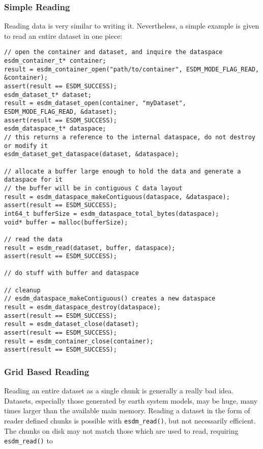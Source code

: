 \subsubsection{Simple Reading}

Reading data is very similar to writing it. 
Nevertheless, a simple example is given to read an entire dataset in one piece:

\begin{lstlisting}
// open the container and dataset, and inquire the dataspace
esdm_container_t* container;
result = esdm_container_open("path/to/container", ESDM_MODE_FLAG_READ, &container);
assert(result == ESDM_SUCCESS);
esdm_dataset_t* dataset;
result = esdm_dataset_open(container, "myDataset", ESDM_MODE_FLAG_READ, &dataset);
assert(result == ESDM_SUCCESS);
esdm_dataspace_t* dataspace;
// this returns a reference to the internal dataspace, do not destroy or modify it
esdm_dataset_get_dataspace(dataset, &dataspace);  

// allocate a buffer large enough to hold the data and generate a dataspace for it
// the buffer will be in contiguous C data layout
result = esdm_dataspace_makeContiguous(dataspace, &dataspace);  
assert(result == ESDM_SUCCESS);
int64_t bufferSize = esdm_dataspace_total_bytes(dataspace);
void* buffer = malloc(bufferSize);

// read the data
result = esdm_read(dataset, buffer, dataspace);
assert(result == ESDM_SUCCESS);

// do stuff with buffer and dataspace

// cleanup
// esdm_dataspace_makeContiguous() creates a new dataspace
result = esdm_dataspace_destroy(dataspace); 
assert(result == ESDM_SUCCESS);
result = esdm_dataset_close(dataset);
assert(result == ESDM_SUCCESS);
result = esdm_container_close(container);
assert(result == ESDM_SUCCESS);
\end{lstlisting}

\subsubsection{Grid Based Reading}

Reading an entire dataset as a single chunk is generally a really bad idea. 
Datasets, especially those generated by earth system models, may be huge, many times larger than the available main memory. 
Reading a dataset in the form of reader defined chunks is possible with \lstinline|esdm_read()|, but not necessarily efficient. 
The chunks on disk may not match those which are used to read, requiring \lstinline|esdm_read()| to


